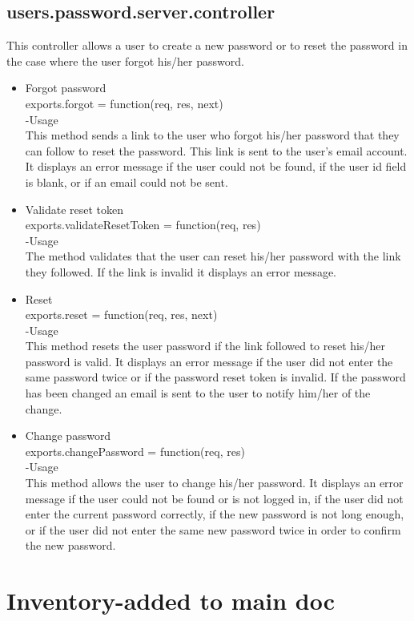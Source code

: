 \documentclass[a4paper,12pt]{article}
\begin{document}
 \subsection{users.password.server.controller}
 This controller allows a user to create a new password or to reset the password in the case where the user forgot his/her password.
 \begin{itemize}
 \item Forgot password\\
 exports.forgot = function(req, res, next)\\
 -Usage\\
 This method sends a link to the user who forgot his/her password that they can follow to reset the password. This link is sent to the user's email account. It displays an error message if the user could not be found, if the user id field is blank, or if an email could not be sent.
 \item Validate reset token\\
 exports.validateResetToken = function(req, res)\\
 -Usage\\
 The method validates that the user can reset his/her password with the link they followed. If the link is invalid it displays an error message.\\
 \item Reset\\
 exports.reset = function(req, res, next)\\
 -Usage\\
 This method resets the user password if the link followed to reset his/her password is valid. It displays an error message if the user did not enter the same password twice or if the password reset token is invalid. If the password has been changed an email is sent to the user to notify him/her of the change.
 \item Change password\\
 exports.changePassword = function(req, res)\\
 -Usage\\
 This method allows the user to change his/her password. It displays an error message if the user could not be found or is not logged in, if the user did not enter the current password correctly, if the new password is not long enough, or if the user did not enter the same new password twice in order to confirm the new password.
 \end{itemize}
 \section{Inventory-added to main doc}
\end{document}
